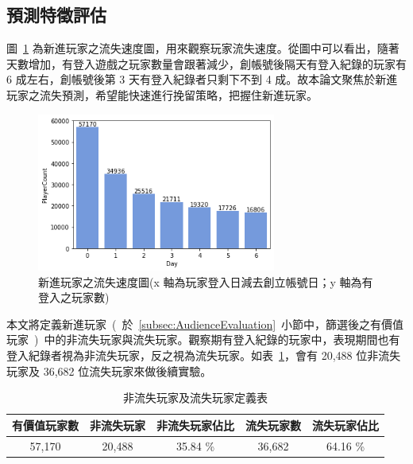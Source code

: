 \subsection{預測特徵評估}
\label{subsec:FeatureEvaluation}

圖~\ref{fig:eva_PlayerChurnPeriod} 為新進玩家之流失速度圖，用來觀察玩家流失速度。從圖中可以看出，隨著天數增加，有登入遊戲之玩家數量會跟著減少，創帳號後隔天有登入紀錄的玩家有 6 成左右，創帳號後第 3 天有登入紀錄者只剩下不到 4 成。故本論文聚焦於新進玩家之流失預測，希望能快速進行挽留策略，把握住新進玩家。

\begin{figure}[!htb]
    \begin{center}
      \includegraphics[width=0.7\textwidth]{figures/evaluation/Image_PlayerChurnPeriod.png}
      \caption[新進玩家之流失速度圖]{新進玩家之流失速度圖(x 軸為玩家登入日減去創立帳號日；y 軸為有登入之玩家數)}
      \label{fig:eva_PlayerChurnPeriod}
    \end{center}
\end{figure}

本文將定義新進玩家\ (\ 於~\ref{subsec:AudienceEvaluation}~小節中，篩選後之有價值玩家\ )\ 中的非流失玩家與流失玩家。觀察期有登入紀錄的玩家中，表現期間也有登入紀錄者視為非流失玩家，反之視為流失玩家。如表~\ref{tab:ChurnPlayerAndNonChurnPlayerDefinition}，會有 20,488 位非流失玩家及 36,682 位流失玩家來做後續實驗。

\begin{table}[!htb]
	\centering
	\begin{tabular}{ccccc}
	\hline \hline
	有價值玩家數 & 非流失玩家 & 非流失玩家佔比 & 流失玩家數 & 流失玩家佔比 \\
    \hline \hline
    57,170 & 20,488 & 35.84 \% & 36,682 & 64.16 \% \\
    \hline \hline
	\end{tabular}
	\caption[非流失玩家及流失玩家定義表]{非流失玩家及流失玩家定義表}
	\label{tab:ChurnPlayerAndNonChurnPlayerDefinition}
\end{table}
\newpage

